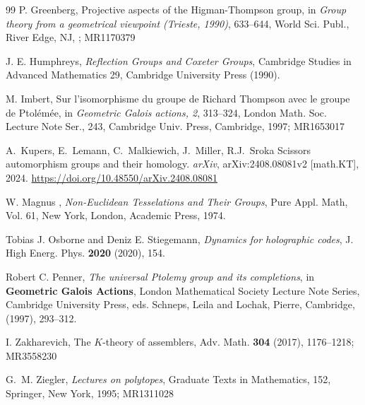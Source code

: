 \documentclass[11pt]{amsart}
\numberwithin{table}{section}
\numberwithin{figure}{section}
\theoremstyle{remark}
\begin{document}
\begin{thebibliography}{99}
  P. Greenberg, Projective aspects of the Higman-Thompson group, in {\it Group theory from a geometrical viewpoint (Trieste, 1990)}, 633--644, World Sci. Publ., River Edge, NJ, ; MR1170379

 J. E. Humphreys, {\em Reflection Groups and Coxeter
    Groups}, Cambridge Studies in Advanced Mathematics 29, Cambridge
  University Press (1990).


  M. Imbert, Sur l'isomorphisme du groupe de Richard Thompson avec le groupe de Ptol\'em\'ee, in {\it Geometric Galois actions, 2}, 313--324, London Math. Soc. Lecture Note Ser., 243, Cambridge Univ. Press, Cambridge, 1997; MR1653017

A.~Kupers, E.~Lemann, C.~Malkiewich, J.~Miller, R.J.~Sroka
\newblock Scissors automorphism groups and their homology. 
\newblock \emph{arXiv},  arXiv:2408.08081v2 [math.KT], 2024.
\newblock \url{https://doi.org/10.48550/arXiv.2408.08081}

 W. Magnus , {\em Non-Euclidean Tesselations and Their
    Groups}, Pure Appl. Math, Vol. 61, New York, London, Academic
  Press, 1974.

 Tobias J. Osborne and Deniz E. Stiegemann,
  \textit{Dynamics for holographic codes}, J. High
  Energ. Phys. \textbf{2020} (2020), 154.

 Robert C. Penner, 
{\sl The universal Ptolemy group and its completions},
in {\bf Geometric Galois Actions}, London Mathematical Society Lecture Note Series, Cambridge University Press,
eds. Schneps, Leila and Lochak, Pierre, Cambridge, (1997), 293--312. 

  I. Zakharevich, The $K$-theory of assemblers, Adv. Math. {\bf 304} (2017), 1176--1218; MR3558230

 G.~M. Ziegler, {\it Lectures on polytopes}, Graduate
  Texts in Mathematics, 152, Springer, New York, 1995; MR1311028

\end{thebibliography}
\end{document}
